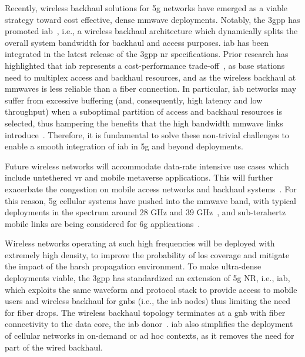Recently, wireless backhaul solutions for \gls{5g} networks have emerged as a viable strategy toward cost effective, dense \gls{mmwave} deployments. Notably, the \gls{3gpp} has promoted \gls{iab}~\cite{3gpp_38_874}, i.e., a wireless backhaul architecture which dynamically splits the overall system bandwidth for backhaul and access purposes. \gls{iab} has been integrated in the latest release of the \gls{3gpp} \gls{nr} specifications. Prior research has highlighted that \gls{iab} represents a cost-performance trade-off~\cite{stoch_geom2, polese2020integrated}, as base stations need to multiplex access and backhaul resources, and as the wireless backhaul at \glspl{mmwave} is less reliable than a fiber connection. In particular, \gls{iab} networks may suffer from excessive buffering (and, consequently, high latency and low throughput) when a suboptimal partition of access and backhaul resources is selected, thus hampering the benefits that the high bandwidth \gls{mmwave} links introduce~\cite{polese2020integrated,polese2018end}. Therefore, it is fundamental to solve these non-trivial challenges to enable a smooth integration of \gls{iab} in \gls{5g} and beyond deployments.



Future wireless networks will accommodate data-rate intensive use cases which include untethered \gls{vr} and mobile metaverse applications. This will further exacerbate the congestion on mobile access networks and backhaul systems~\cite{holo1}. For this reason, \gls{5g} cellular systems have pushed into the \gls{mmwave} band, with typical deployments in the spectrum around 28 GHz and 39 GHz~\cite{shafi2017deployment}, and sub-terahertz mobile links are being considered for \gls{6g} applications~\cite{polese2020toward,8869705}.

Wireless networks operating at such high frequencies will be deployed with extremely high density, to improve the probability of \gls{los} coverage and mitigate the impact of the harsh propagation environment. To make ultra-dense deployments viable, the \gls{3gpp} has standardized an extension of \gls{5g} NR, i.e., \gls{iab}, which exploits the same waveform and protocol stack to provide access to mobile users and wireless backhaul for \glspl{gnb} (i.e., the \gls{iab} nodes) thus limiting the need for fiber drops. The wireless backhaul topology terminates at a \gls{gnb} with fiber connectivity to the data core, the \gls{iab} donor~\cite{9187867,stoch_geom2,3gpp_38_174}. \gls{iab} also simplifies the deployment of cellular networks in on-demand or ad hoc contexts, as it removes the need for part of the wired backhaul.

